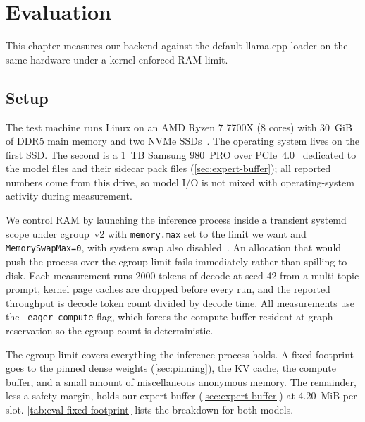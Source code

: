 
\chapter{Evaluation}\label{chapter:evaluation}

This chapter measures our backend against the default llama.cpp loader on the same hardware under a kernel-enforced RAM limit.


\section{Setup}\label{sec:eval-setup}\label{sec:eval-hardware}

The test machine runs Linux on an AMD Ryzen 7 7700X (8 cores) with 30~GiB of DDR5 main memory and two NVMe SSDs~\cite{amd_ryzen7700x,jedec_ddr5}.
The operating system lives on the first SSD.
The second is a 1~TB Samsung 980~PRO over PCIe~4.0~\cite{pcisig_pcie4} dedicated to the model files and their sidecar pack files (\autoref{sec:expert-buffer}); all reported numbers come from this drive, so model I/O is not mixed with operating-system activity during measurement.

We control RAM by launching the inference process inside a transient systemd scope under cgroup~v2 with \texttt{memory.max} set to the limit we want and \texttt{MemorySwapMax=0}, with system swap also disabled~\cite{cgroupv2}.
An allocation that would push the process over the cgroup limit fails immediately rather than spilling to disk.
Each measurement runs 2000 tokens of decode at seed 42 from a multi-topic prompt, kernel page caches are dropped before every run, and the reported throughput is decode token count divided by decode time.
All measurements use the \texttt{--eager-compute} flag, which forces the compute buffer resident at graph reservation so the cgroup count is deterministic.

The cgroup limit covers everything the inference process holds.
A fixed footprint goes to the pinned dense weights (\autoref{sec:pinning}), the KV cache, the compute buffer, and a small amount of miscellaneous anonymous memory.
The remainder, less a safety margin, holds our expert buffer (\autoref{sec:expert-buffer}) at 4.20~MiB per slot.
\autoref{tab:eval-fixed-footprint} lists the breakdown for both models.

